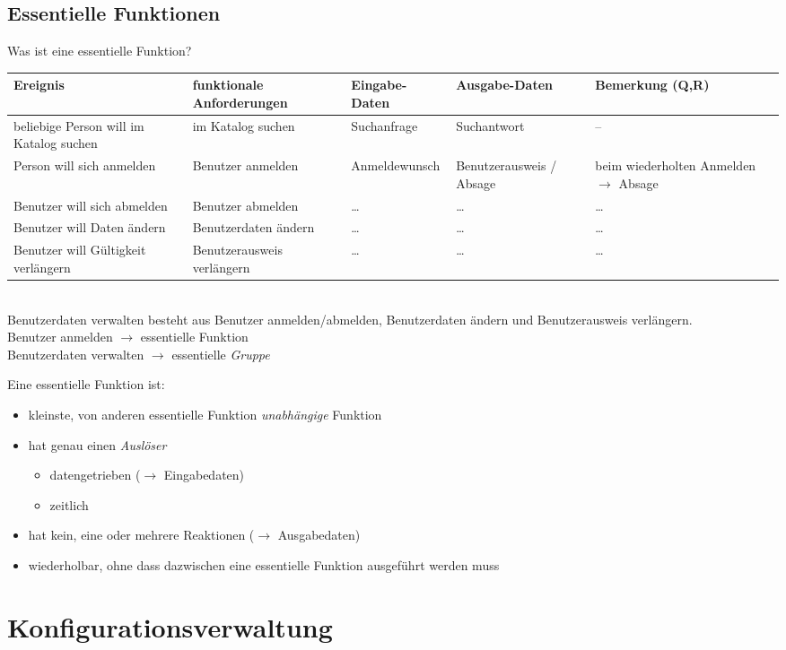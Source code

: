 
\section{Essentielle Funktionen}
Was ist eine essentielle Funktion?\\
\begin{tabular}{L{.2} | L{.2} | L{.15} | L{.15} | L{.25}}
Ereignis & funktionale Anforderungen & Eingabe-Daten & Ausgabe-Daten &Bemerkung (Q,R)\\
\hline\hline
beliebige Person will im Katalog suchen & im Katalog suchen & Suchanfrage & Suchantwort & --\\\hline
Person will sich anmelden & Benutzer anmelden & Anmeldewunsch & Benutzerausweis / Absage & beim wiederholten Anmelden $\to$ Absage\\\hline
Benutzer will sich abmelden & Benutzer abmelden & … & … & …\\\hline
Benutzer will Daten ändern & Benutzerdaten ändern & … & … & …\\\hline
Benutzer will Gültigkeit verlängern & Benutzerausweis verlängern & … & … & …
\end{tabular}\\
Benutzerdaten verwalten besteht aus Benutzer anmelden/abmelden, Benutzerdaten ändern und Benutzerausweis verlängern.\\
Benutzer anmelden $\to$ essentielle Funktion\\
Benutzerdaten verwalten $\to$ essentielle \emph{Gruppe}\\\bigskip

Eine essentielle Funktion ist:
\begin{itemize}
\item kleinste, von anderen essentielle Funktion \emph{unabhängige} Funktion
\item hat genau einen \emph{Auslöser}
\begin{itemize}
\item datengetrieben ($\to$ Eingabedaten)
\item zeitlich
\end{itemize}
\item hat kein, eine oder mehrere Reaktionen ($\to$ Ausgabedaten)
\item wiederholbar, ohne dass dazwischen eine essentielle Funktion ausgeführt werden muss
\end{itemize}

\chapter{Konfigurationsverwaltung}
